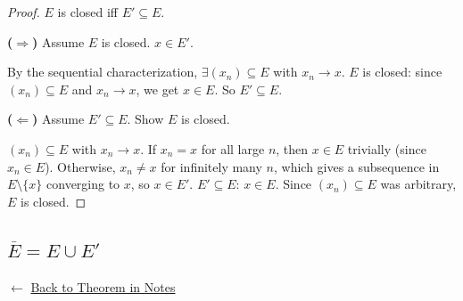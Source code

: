 \begin{proof}
\Claim $E$ is closed iff $E' \subseteq E$.

\medskip
\noindent\textbf{($\Rightarrow$)} Assume $E$ is closed. \Let $x \in E'$.

By the sequential characterization, $\exists (x_n) \subseteq E$ with $x_n \to x$.
\ByAss $E$ is closed: since $(x_n) \subseteq E$ and $x_n \to x$, we get $x \in E$.
So $E' \subseteq E$.

\medskip
\noindent\textbf{($\Leftarrow$)} Assume $E' \subseteq E$. Show $E$ is closed.

\Let $(x_n) \subseteq E$ with $x_n \to x$.
If $x_n = x$ for all large $n$, then $x \in E$ trivially (since $x_n \in E$).
Otherwise, $x_n \neq x$ for infinitely many $n$, which gives a subsequence in
$E \setminus \{x\}$ converging to $x$, so $x \in E'$.
\ByAss $E' \subseteq E$: $x \in E$.
Since $(x_n) \subseteq E$ was arbitrary, $E$ is closed. \AsReq
\end{proof}

\subsection*{$\overline{E} = E \cup E'$}
\label{prf:closure-formula}

\begin{remark*}[Return]
$\leftarrow$ \hyperref[thm:closure-formula]{Back to Theorem in Notes}
\end{remark*}

